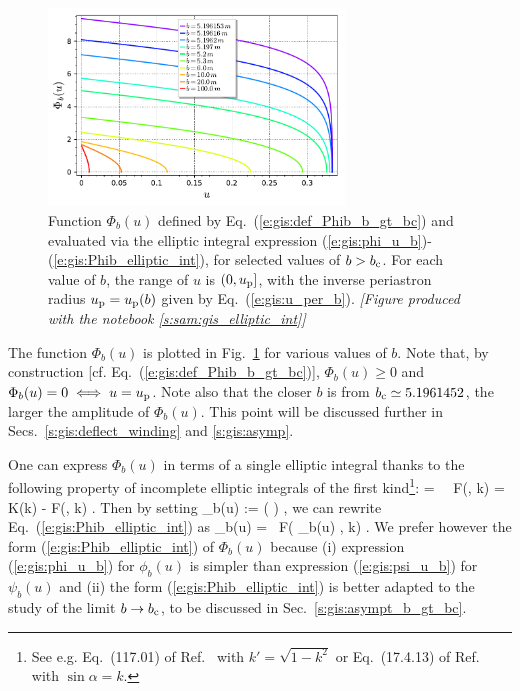 \begin{figure}
\centerline{\includegraphics[width=0.7\textwidth]{gis_Phib_b_gt_bc.pdf}}
\caption[]{\label{f:gis:Phib_b_gt_bc} \footnotesize
Function $\Phi_b(u)$ defined by Eq.~(\ref{e:gis:def_Phib_b_gt_bc}) and
evaluated via the elliptic integral expression (\ref{e:gis:phi_u_b})-(\ref{e:gis:Phib_elliptic_int}),
for selected values of $b > b_{\rm c}$. For each value of $b$, the range of
$u$ is $(0, u_{\rm p}]$, with the inverse periastron radius $u_{\rm p} = u_{\rm p}(b)$
given by Eq.~(\ref{e:gis:u_per_b}).
\textsl{[Figure produced with the notebook \ref{s:sam:gis_elliptic_int}]}
}
\end{figure}

The function $\Phi_b(u)$ is plotted in Fig.~\ref{f:gis:Phib_b_gt_bc} for
various values of $b$. Note that, by construction [cf. Eq.~(\ref{e:gis:def_Phib_b_gt_bc})],
$\Phi_b(u) \geq 0$ and $\Phi_b(u) = 0 \iff u = u_{\rm p}$. Note also that the closer
$b$ is from $b_{\rm c} \simeq 5.1961452$, the larger the amplitude of $\Phi_b(u)$. This
point will be discussed further in Secs.~\ref{s:gis:deflect_winding}
and \ref{s:gis:asymp}.

\begin{remark}
One can express $\Phi_b(u)$ in terms of a single elliptic integral
thanks to the following property of incomplete elliptic
integrals of the first kind\footnote{See e.g. Eq.~(117.01) of
Ref.~\cite{ByrdF71} with $k' = \sqrt{1-k^2}$
or Eq.~(17.4.13) of Ref.~\cite{AbramS72} with $\sin\alpha = k$.}:
\be \label{e:gis:add_elliptic_int}
   \tan\psi \tan\phi = \ \Longrightarrow \
   F(\psi, k) = K(k) - F(\phi, k) .
\ee
Then by setting
\be \label{e:gis:psi_u_b}
  \psi_b(u) := \arcsin\left(  \right) ,
\ee
we can rewrite Eq.~(\ref{e:gis:Phib_elliptic_int}) as
\be \label{e:gis:Phib_elliptic_int_psi}
     \Phi_b(u) = 
    \, F\left( \psi_b(u) ,\; k\right)  .
\ee
We prefer however the form (\ref{e:gis:Phib_elliptic_int}) of $\Phi_b(u)$
because (i) expression (\ref{e:gis:phi_u_b}) for $\phi_b(u)$ is simpler than
expression (\ref{e:gis:psi_u_b}) for $\psi_b(u)$ and (ii) the form (\ref{e:gis:Phib_elliptic_int}) is better adapted to the study of the limit
$b\to b_{\rm c}$, to be discussed in Sec.~\ref{s:gis:asympt_b_gt_bc}.
\end{remark}

